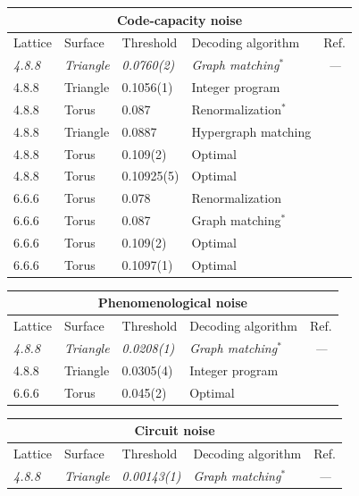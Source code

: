 \documentclass[letterpaper,showpacs,superscriptaddress,twocolumn,aps,prl]{revtex4-1}
\begin{document}
\begin{table}
\begin{center}
\vspace*{4pt}   
\begin{tabular}{llllc}
\multicolumn{5}{c}{Code-capacity noise}\\
\hline\hline
Lattice & Surface & Threshold & Decoding algorithm & Ref.\\
\hline
{\it 4.8.8} & {\it Triangle} & {\it 0.0760(2)} & {\it Graph matching$^*$} & {\it ---} \\
\hline
4.8.8 & Triangle & 0.1056(1) & Integer program & \cite{Landahl1} \\
4.8.8 & Torus & 0.087 & Renormalization$^*$ & \cite{Bombin12} \\
4.8.8 & Triangle & 0.0887 & Hypergraph matching & \cite{Wang10} \\
4.8.8 & Torus & 0.109(2) & Optimal & \cite{Katzgraber09} \\
4.8.8 & Torus & 0.10925(5) & Optimal & \cite{Ohzeki09} \\
\hline
6.6.6 & Torus & 0.078 & Renormalization & \cite{Sarvepalli1} \\
6.6.6 & Torus & 0.087 & Graph matching$^*$ & \cite{Delfosse1} \\
6.6.6 & Torus & 0.109(2) & Optimal & \cite{Katzgraber09} \\
6.6.6 & Torus & 0.1097(1) & Optimal & \cite{Ohzeki09} \\
\hline\hline
\end{tabular}
\begin{tabular}{llllc}
\\
\multicolumn{5}{c}{Phenomenological noise}\\
\hline\hline
Lattice & Surface & Threshold & Decoding algorithm & Ref.\\
\hline
{\it 4.8.8} & {\it Triangle} & {\it 0.0208(1)} & {\it Graph matching$^*$} & {\it ---} \\
\hline
4.8.8 & Triangle & 0.0305(4) & Integer program & \cite{Landahl1} \\
\hline
6.6.6 & Torus & 0.045(2) & Optimal & \cite{Andrist11} \\
\hline\hline
\end{tabular}
\begin{tabular}{llllc}
\\
\multicolumn{5}{c}{Circuit noise}\\
\hline\hline
Lattice & Surface & Threshold & Decoding algorithm & Ref.\\
\hline
{\it 4.8.8} & {\it Triangle} & {\it 0.00143(1)} & {\it Graph matching$^*$} & {\it ---} \\

\end{tabular}
\end{center}
\end{table}
\end{document}
